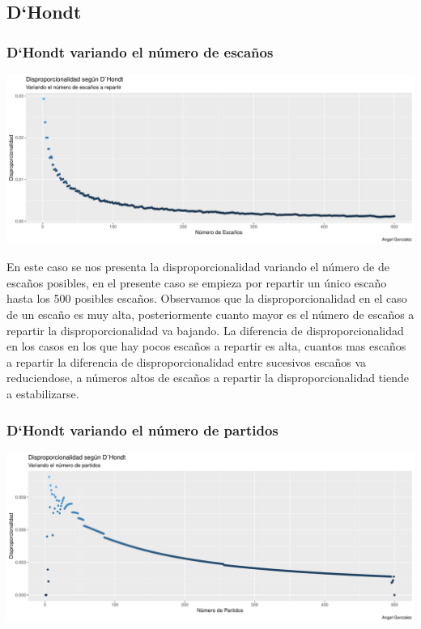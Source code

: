 \documentclass[12pt,a4paper,]{book}
\numberwithin{dummy}{section}
\theoremstyle{ocrenumbox}
\theoremstyle{blacknumex}
\theoremstyle{blacknumbox}
\theoremstyle{ocrenum}
\theoremstyle{ocrenum}
\begin{document}
\hypertarget{dhondt}{%
\subsection{D`Hondt}\label{dhondt}}

\hypertarget{dhondt-variando-el-nuxfamero-de-escauxf1os}{%
\subsubsection{D`Hondt variando el número de
escaños}\label{dhondt-variando-el-nuxfamero-de-escauxf1os}}

\begin{center}\includegraphics[width=0.95\linewidth]{figurasR/unnamed-chunk-9-1} \end{center}

En este caso se nos presenta la disproporcionalidad variando el número
de de escaños posibles, en el presente caso se empieza por repartir un
único escaño hasta los 500 posibles escaños. Observamos que la
disproporcionalidad en el caso de un escaño es muy alta, posteriormente
cuanto mayor es el número de escaños a repartir la disproporcionalidad
va bajando. La diferencia de disproporcionalidad en los casos en los que
hay pocos escaños a repartir es alta, cuantos mas escaños a repartir la
diferencia de disproporcionalidad entre sucesivos escaños va
reduciendose, a números altos de escaños a repartir la
disproporcionalidad tiende a estabilizarse.

\hypertarget{dhondt-variando-el-nuxfamero-de-partidos}{%
\subsubsection{D`Hondt variando el número de
partidos}\label{dhondt-variando-el-nuxfamero-de-partidos}}

\begin{center}\includegraphics[width=0.95\linewidth]{figurasR/unnamed-chunk-10-1} \end{center}
\end{document}
